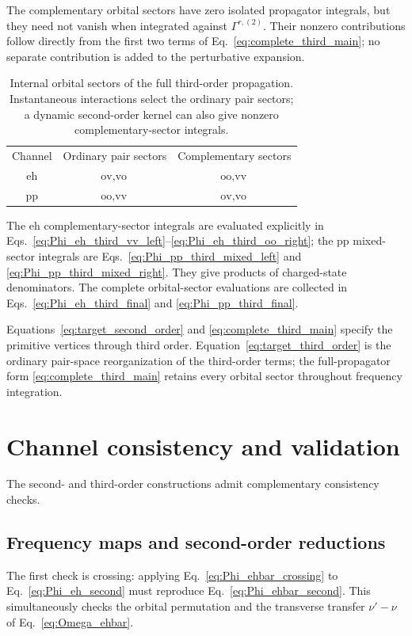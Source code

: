 \documentclass[aip,jcp,reprint,noshowkeys,superscriptaddress]{revtex4-1}
\newcommand{\eh}{\text{eh}}
\newcommand{\pp}{\text{pp}}
\begin{document}
The complementary orbital sectors have zero isolated propagator integrals,
but they need not vanish when integrated against $\Gamma^{r,(2)}$.
Their nonzero contributions follow directly from the first two terms of
Eq.~\eqref{eq:complete_third_main}; no separate contribution is added to
the perturbative expansion.
\begin{table}[b]
\caption{Internal orbital sectors of the full third-order propagation.
Instantaneous interactions select the ordinary pair sectors; a dynamic
second-order kernel can also give nonzero complementary-sector integrals.}
\label{tab:orbital_sectors}
\begin{ruledtabular}
\begin{tabular}{ccc}
Channel & Ordinary pair sectors & Complementary sectors \\
$\eh$ & $\text{ov},\text{vo}$ & $\text{oo},\text{vv}$ \\
$\pp$ & $\text{oo},\text{vv}$ & $\text{ov},\text{vo}$
\end{tabular}
\end{ruledtabular}
\end{table}

The $\eh$ complementary-sector integrals are evaluated explicitly in
Eqs.~\eqref{eq:Phi_eh_third_vv_left}--\eqref{eq:Phi_eh_third_oo_right};
the $\pp$ mixed-sector integrals are
Eqs.~\eqref{eq:Phi_pp_third_mixed_left} and
\eqref{eq:Phi_pp_third_mixed_right}.
They give products of charged-state denominators.
The complete orbital-sector evaluations are collected in
Eqs.~\eqref{eq:Phi_eh_third_final} and \eqref{eq:Phi_pp_third_final}.

Equations~\eqref{eq:target_second_order} and
\eqref{eq:complete_third_main} specify the primitive vertices through third
order. Equation~\eqref{eq:target_third_order} is the ordinary pair-space
reorganization of the third-order terms; the full-propagator form
\eqref{eq:complete_third_main} retains every orbital sector throughout
frequency integration.

\section{Channel consistency and validation}
\label{sec:channel_consistency}

The second- and third-order constructions admit complementary consistency checks.
\subsection{Frequency maps and second-order reductions}
The first check is crossing: applying
Eq.~\eqref{eq:Phi_ehbar_crossing} to
Eq.~\eqref{eq:Phi_eh_second} must reproduce
Eq.~\eqref{eq:Phi_ehbar_second}.
This simultaneously checks the orbital permutation and the transverse
transfer $\nu'-\nu$ of Eq.~\eqref{eq:Omega_ehbar}.
\end{document}
